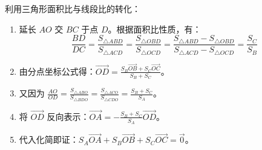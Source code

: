 \begin{proofbox}
利用三角形面积比与线段比的转化：
\begin{enumerate}
    \item 延长 $AO$ 交 $BC$ 于点 $D$。根据面积比性质，有：
    \[ \frac{BD}{DC} = \frac{S_{\triangle ABD}}{S_{\triangle ACD}} = \frac{S_{\triangle OBD}}{S_{\triangle OCD}} = \frac{S_{\triangle ABD}-S_{\triangle OBD}}{S_{\triangle ACD}-S_{\triangle OCD}} = \frac{S_C}{S_B} \]
    \item 由分点坐标公式得：$\vec{OD} = \frac{S_B \vec{OB} + S_C \vec{OC}}{S_B + S_C}$。
    \item 又因为 $\frac{AO}{OD} = \frac{S_{\triangle ABO}}{S_{\triangle BDO}} = \frac{S_{\triangle ACO}}{S_{\triangle CDO}} = \frac{S_B+S_C}{S_A}$。
    \item 将 $\vec{OD}$ 反向表示：$\vec{OA} = -\frac{S_B+S_C}{S_A} \vec{OD}$。
    \item 代入化简即证：$S_A \vec{OA} + S_B \vec{OB} + S_C \vec{OC} = \vec{0}$。
\end{enumerate}
\end{proofbox}